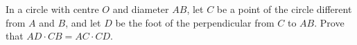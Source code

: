 In a circle with centre $O$ and diameter $AB$, let $C$ be a point of the circle different from $A$ and $B$, and let $D$ be the foot of the perpendicular from $C$ to $AB$. Prove that $AD\cdot CB=AC\cdot CD$.
